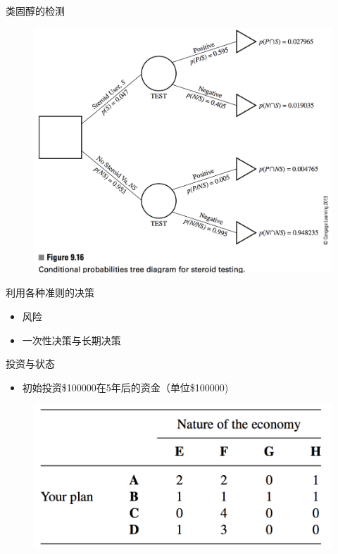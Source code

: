 \documentclass[mathserif, table]{beamer}
\begin{document}
\begin{frame}{类固醇的检测}
  
  \begin{figure}
    \includegraphics[width=0.8\textwidth{}]{9_16.png}
  \end{figure}

\end{frame}

\begin{frame}{利用各种准则的决策}

  \begin{itemize}
  \item 风险
  \item 一次性决策与长期决策
  \end{itemize}
  
\end{frame}

\begin{frame}{投资与状态}

  \begin{itemize}
  \item 初始投资\$100000在5年后的资金（单位\$100000)
  \end{itemize}
  
  \begin{figure}
    \includegraphics[width=0.8\textwidth{}]{plan.png}
  \end{figure}

\end{frame}
\end{document}
